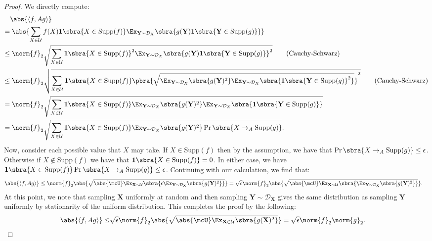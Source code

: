 \begin{proof}
    We directly compute:
    \begin{align*}
        &\abs{\left\langle f,Ag\right\rangle}\\
        =&\;\abs{\sum_{X\in\mathcal{U}}{f(X)\mathbf{1}\sbra{X\in \mathrm{Supp}(f)}\Ex_{\mathbf{Y}\sim\mathcal{D}_{X}}\sbra{g(\mathbf{Y})\mathbf{1}\sbra{\mathbf{Y}\in \mathrm{Supp}(g)}}}}\\
        \leq&\;{\norm{f}_2\sqrt{\sum_{X\in\mathcal{U}}{\mathbf{1}\sbra{X\in \mathrm{Supp}(f)}^2\Ex_{\mathbf{Y}\sim\mathcal{D}_{X}}\sbra{g(\mathbf{Y})\mathbf{1}\sbra{\mathbf{Y}\in \mathrm{Supp}(g)}}^2}}}\tag{Cauchy-Schwarz}\\
        \leq&\;{\norm{f}_2\sqrt{\sum_{X \in\mathcal{U}}{\mathbf{1}\sbra{X\in \mathrm{Supp}(f)}\pbra{\sqrt{\Ex_{\mathbf{Y}\sim\mathcal{D}_{X}}\sbra{g(\mathbf{Y})^2}\Ex_{\mathbf{Y}\sim\mathcal{D}_{X}}\sbra{\mathbf{1}\sbra{\mathbf{Y}\in \mathrm{Supp}(g)}^2}}}^2}}}\tag{Cauchy-Schwarz}\\
        =&\;{\norm{f}_2\sqrt{\sum_{X \in\mathcal{U}}{\mathbf{1}\sbra{X\in \mathrm{Supp}(f)}\Ex_{\mathbf{Y}\sim\mathcal{D}_{X}}\sbra{g(\mathbf{Y})^2}\Ex_{\mathbf{Y}\sim\mathcal{D}_{X}}\sbra{\mathbf{1}\sbra{\mathbf{Y}\in \mathrm{Supp}(g)}}}}}\\
        =&\; \norm{f}_2\sqrt{\sum_{X\in\mathcal{U}}{\mathbf{1}\sbra{X\in \mathrm{Supp}(f)}\Ex_{\mathbf{Y}\sim\mathcal{D}_{X}}\sbra{g(\mathbf{Y})^2}}\Pr\sbra{X\to_{A}\mathrm{Supp}(g)}}.
    \end{align*}
    Now, consider each possible value that $X$ may take. If $X\in\mathrm{Supp}(f)$ then by the assumption, we have that $\Pr\sbra{X\to_{A}\mathrm{Supp}(g)}\leq \epsilon$. Otherwise if $X\not\in\mathrm{Supp}(f)$ we have that $\mathbf{1}\sbra{X\in\mathrm{Supp}(f)}=0$. In either case, we have $\mathbf{1}\sbra{X\in \mathrm{Supp}(f)}\Pr\sbra{X\to_{A}\mathrm{Supp}(g)}\leq \epsilon$. Continuing with our calculation, we find that:
    \begin{align*}
        &\abs{\left\langle f,Ag\right\rangle }
        \leq\norm{f}_2\abs{ \sqrt{\abs{\mcU}\Ex_{\mathbf{X} \sim\mathcal{U}}\sbra{\epsilon\Ex_{\mathbf{Y}\sim\mathcal{D}_{\mathbf{X}}}\sbra{g(\mathbf{Y})^2}}} } =\sqrt\epsilon\norm{f}_2\abs{\sqrt{\abs{\mcU}\Ex_{\mathbf{X} \sim \mathcal{U}}\sbra{\Ex_{\mathbf{Y} \sim \mathcal{D}_{\mathbf{X}}}\sbra{g(\mathbf{Y})^2}}}}.
    \end{align*}
    At this point, we note that sampling $\mathbf{X}$ uniformly at random and then sampling $\mathbf{Y}\sim\mathcal{D}_{\mathbf{X}}$ gives the same distribution as sampling $\mathbf{Y}$ uniformly by stationarity of the uniform distribution. This completes the proof by the following:
    \begin{align*}
        \abs{\left\langle f,Ag\right\rangle}\leq& \sqrt\epsilon\norm{f}_2\abs{\sqrt{\abs{\mcU}\Ex_{\mathbf{X} \in\mathcal{U}}\sbra{g(\mathbf{X})^2}}}=\sqrt\epsilon\norm{f}_2\norm{g}_2.
    \end{align*}
\end{proof}
